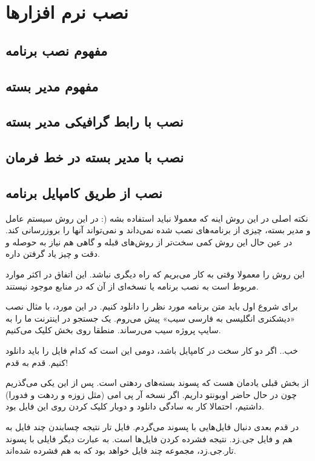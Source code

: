 \section{نصب نرم افزارها}
\subsection*{مفهوم نصب برنامه}
\subsection*{مفهوم مدیر بسته}
\subsection*{نصب با رابط گرافیکی مدیر بسته}
\subsection*{نصب با مدیر بسته در خط فرمان}
\subsection*{نصب از طریق کامپایل برنامه}
نکته اصلی در این روش اینه که معمولا نباید استفاده بشه (: در این روش سیستم عامل و مدیر بسته، چیزی از برنامه‌های نصب شده نمی‌داند و نمی‌تواند آنها را بروزرسانی کند. در عین حال این روش کمی سخت‌تر از روش‌های قبله و گاهی هم نیاز به حوصله و دقت و چیز یاد گرفتن داره.

این روش را معمولا وقتی به کار می‌بریم که راه دیگری نباشد. این اتفاق در اکثر موارد مربوط است به نصب برنامه یا نسخه‌ای از آن که در منابع موجود نیستند.

برای شروع اول باید متن برنامه مورد نظر را دانلود کنیم. در این مورد، با مثال نصب «دیشکنری انگلیسی به فارسی سیب» پیش می‌روم. یک جستجو در اینترنت ما را به سایپ پروژه سیب می‌رساند. منطقا روی بخش 
 کلیک می‌کنیم.

خب.. اگر دو کار سخت در کامپایل باشد، دومی این است که کدام فایل را باید دانلود کنیم. قدم به قدم!

از بخش قبلی یادمان هست که 
 پسوند بسته‌های ردهتی است. پس از این یکی می‌گذریم چون در حال حاضر اوبونتو داریم. اگر نسخه آر پی امی (مثل زوزه و ردهت و فدورا) داشتیم، احتمالا کار به سادگی دانلود و دوبار کلیک کردن روی این فایل بود.

در قدم بعدی دنبال فایل‌هایی با پسوند 
 می‌گردم. فایل تار نتیجه چسابندن چند فایل به هم و فایل جی.زد. نتیجه فشرده کردن فایل‌ها است. به عبارت دیگر فایلی با پسوند تار.جی.زد، مجموعه چند فایل خواهد بود که به هم فشرده شده‌اند.

